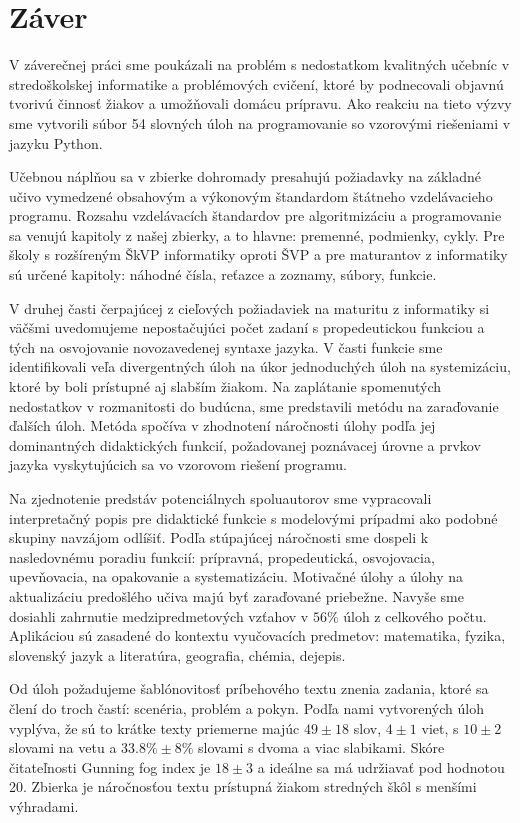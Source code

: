 \chapter{Záver}
V záverečnej práci sme poukázali na problém s nedostatkom kvalitných učebníc v stredoškolskej informatike a problémových cvičení, ktoré by podnecovali objavnú tvorivú činnosť žiakov a umožňovali domácu prípravu. Ako reakciu na tieto výzvy sme vytvorili súbor 54 slovných úloh na programovanie so vzorovými riešeniami v jazyku Python.

Učebnou náplňou sa v zbierke dohromady presahujú požiadavky na základné učivo vymedzené obsahovým a výkonovým štandardom štátneho vzdelávacieho programu. Rozsahu vzdelávacích štandardov pre algoritmizáciu a programovanie sa venujú kapitoly z našej zbierky, a to hlavne: premenné, podmienky, cykly. Pre školy s rozšíreným ŠkVP informatiky oproti ŠVP a pre maturantov z informatiky sú určené kapitoly: náhodné čísla, reťazce a zoznamy, súbory, funkcie.

V druhej časti čerpajúcej z cieľových požiadaviek na maturitu z informatiky si väčšmi uvedomujeme nepostačujúci počet zadaní s propedeutickou funkciou a tých na osvojovanie novozavedenej syntaxe jazyka. V časti funkcie sme identifikovali veľa divergentných úloh na úkor jednoduchých úloh na systemizáciu, ktoré by boli prístupné aj slabším žiakom. Na zaplátanie spomenutých nedostatkov v rozmanitosti do budúcna, sme predstavili metódu na zaraďovanie ďalších úloh. Metóda spočíva v zhodnotení náročnosti úlohy podľa jej dominantných didaktických funkcií, požadovanej poznávacej úrovne a prvkov jazyka vyskytujúcich sa vo vzorovom riešení programu.

Na zjednotenie predstáv potenciálnych spoluautorov sme vypracovali interpretačný popis pre didaktické funkcie s modelovými prípadmi ako podobné skupiny navzájom odlíšiť. Podľa stúpajúcej náročnosti sme dospeli k nasledovnému poradiu funkcií: prípravná, propedeutická, osvojovacia, upevňovacia, na opakovanie a systematizáciu. Motivačné úlohy a úlohy na aktualizáciu predošlého učiva majú byť zaraďované priebežne. Navyše sme dosiahli zahrnutie medzipredmetových vzťahov v $56 \%$ úloh z celkového počtu. Aplikáciou sú zasadené do kontextu vyučovacích predmetov: matematika, fyzika, slovenský jazyk a literatúra, geografia, chémia, dejepis.

Od úloh požadujeme šablónovitosť príbehového textu znenia zadania, ktoré sa člení do troch častí: scenéria, problém a pokyn. Podľa nami vytvorených úloh vyplýva, že sú to krátke texty priemerne majúc $49 \pm 18$ slov, $4 \pm 1$ viet, s $10 \pm 2$ slovami na vetu a $33.8\% \pm 8\%$ slovami s dvoma a viac slabikami. Skóre čitateľnosti Gunning fog index je $18 \pm 3$ a ideálne sa má udržiavať pod hodnotou 20. Zbierka je náročnosťou textu prístupná žiakom stredných škôl s menšími výhradami.

